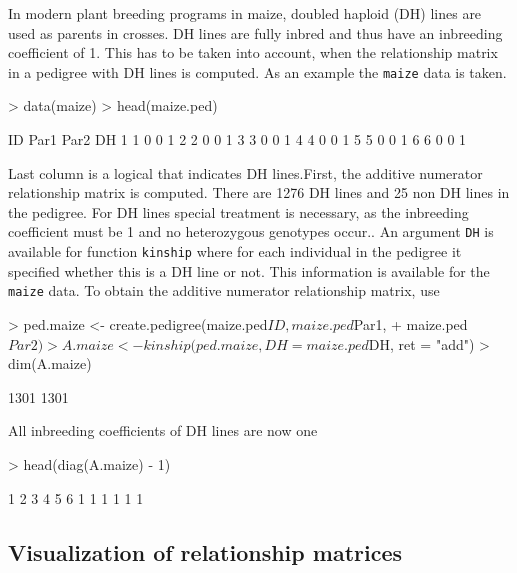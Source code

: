 \documentclass[a4paper,11pt]{article}
\begin{document}
In modern plant breeding programs in maize, doubled haploid (DH) lines are used as parents in crosses. DH lines are fully inbred and thus have an inbreeding coefficient of 1. This has to be taken into account, when the relationship matrix in a pedigree with DH lines is computed.  As an example the \texttt{maize} data is taken.
\begin{Schunk}
\begin{Sinput}
> data(maize)
> head(maize.ped)
\end{Sinput}
\begin{Soutput}
  ID Par1 Par2 DH
1  1    0    0  1
2  2    0    0  1
3  3    0    0  1
4  4    0    0  1
5  5    0    0  1
6  6    0    0  1
\end{Soutput}
\end{Schunk}
Last column is a logical that indicates DH lines.First, the additive numerator relationship matrix is computed. There are 1276 DH lines and 25 non DH lines in the pedigree. For DH lines special treatment is necessary, as the inbreeding coefficient must be 1 and no heterozygous genotypes occur.. An argument \texttt{DH} is available for function \texttt{kinship} where
for each individual in the pedigree it specified whether this is a DH line or not. This information is available for the \texttt{maize} data. To obtain the additive numerator relationship matrix, use 
\begin{Schunk}
\begin{Sinput}
> ped.maize <- create.pedigree(maize.ped$ID, maize.ped$Par1, 
+     maize.ped$Par2)
> A.maize <- kinship(ped.maize, DH = maize.ped$DH, ret = "add")
> dim(A.maize)
\end{Sinput}
\begin{Soutput}
[1] 1301 1301
\end{Soutput}
\end{Schunk}
All inbreeding coefficients of DH lines are now one
\begin{Schunk}
\begin{Sinput}
> head(diag(A.maize) - 1)
\end{Sinput}
\begin{Soutput}
1 2 3 4 5 6 
1 1 1 1 1 1 
\end{Soutput}
\end{Schunk}

\subsection{Visualization of relationship matrices}
\end{document}
